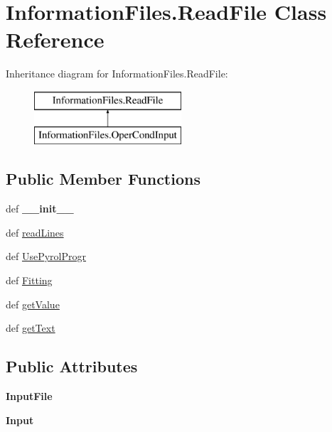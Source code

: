 \hypertarget{classInformationFiles_1_1ReadFile}{\section{\-Information\-Files.\-Read\-File \-Class \-Reference}
\label{classInformationFiles_1_1ReadFile}
}
\-Inheritance diagram for \-Information\-Files.\-Read\-File\-:\begin{figure}[H]
\begin{center}
\leavevmode
\includegraphics[height=2.000000cm]{classInformationFiles_1_1ReadFile}
\end{center}
\end{figure}
\subsection*{\-Public \-Member \-Functions}
\begin{DoxyCompactItemize}
\item 
\hypertarget{classInformationFiles_1_1ReadFile_ade33b94049e1245d790563a2988df6b0}{def {\bfseries \-\_\-\-\_\-init\-\_\-\-\_\-}}\label{classInformationFiles_1_1ReadFile_ade33b94049e1245d790563a2988df6b0}

\item 
def \hyperlink{classInformationFiles_1_1ReadFile_a33eb756d9e63ef0f7e0ad1c175406ef0}{read\-Lines}
\item 
def \hyperlink{classInformationFiles_1_1ReadFile_a259b8dd2f0754fe46c67e1af6c82ec5d}{\-Use\-Pyrol\-Progr}
\item 
def \hyperlink{classInformationFiles_1_1ReadFile_acbbf6f298c76c66d18d56c787225fcb7}{\-Fitting}
\item 
def \hyperlink{classInformationFiles_1_1ReadFile_a2911cbdb92a645b6114feca74fc69aba}{get\-Value}
\item 
def \hyperlink{classInformationFiles_1_1ReadFile_ae3432e04c7dde26bbcdb97d4436c1d70}{get\-Text}
\end{DoxyCompactItemize}
\subsection*{\-Public \-Attributes}
\begin{DoxyCompactItemize}
\item 
\hypertarget{classInformationFiles_1_1ReadFile_a129e3d7eee05b28541056afe51d3592a}{{\bfseries \-Input\-File}}\label{classInformationFiles_1_1ReadFile_a129e3d7eee05b28541056afe51d3592a}

\item 
\hypertarget{classInformationFiles_1_1ReadFile_a0c7c8f211c8642e3f3d66d5c3f9e585a}{{\bfseries \-Input}}\label{classInformationFiles_1_1ReadFile_a0c7c8f211c8642e3f3d66d5c3f9e585a}

\end{DoxyCompactItemize}



